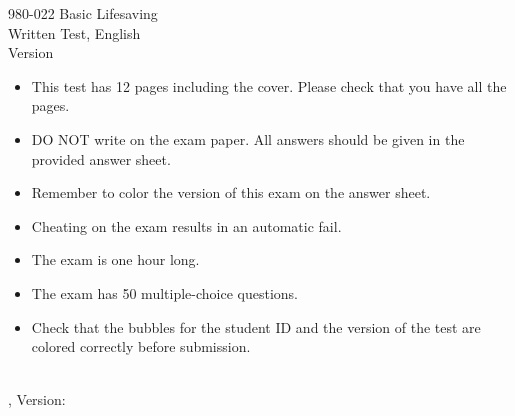 \documentclass[a4paper,16pt]{examdesign}
\begin{document}
\begin{frontmatter}
	\vspace*{2in}
	\begin{center}
		{\huge 980-022 Basic Lifesaving} \\
		\vspace{1in}
		{\huge Written Test, English} \\
		\vspace{1in}
		{\huge Version } \\
		\vspace{1in}
		\begin{itemize}
		\item This test has 12 pages including the cover. Please check that you have all the pages. 
		\item DO NOT write on the exam paper. All answers should be given in the provided answer sheet.
		\item Remember to color the version of this exam on the answer sheet.
		\item Cheating on the exam results in an automatic fail.
		\item The exam is one hour long. 
		\item The exam has 50 multiple-choice questions.
		\item Check that the bubbles for the student ID and the version of the test are colored correctly before submission.
		\end{itemize}
	\end{center}
	\vfill
\end{frontmatter}


\begin{examtop}
	{\parbox{3in}{\classdata \\
	\examtype, Version: }}
\end{examtop}
\end{document}
